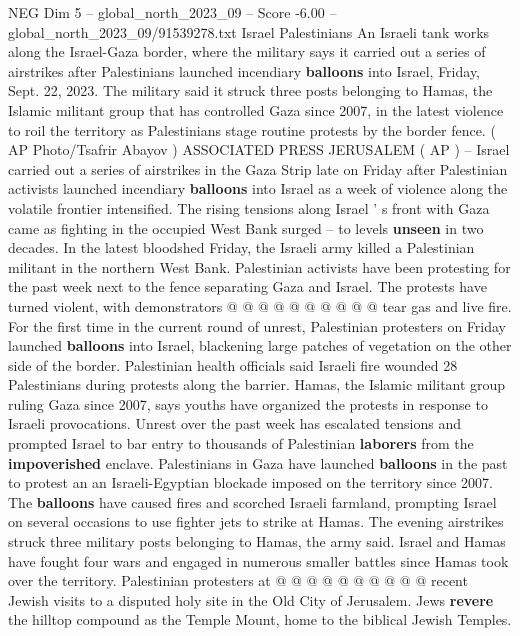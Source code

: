 \begin{textsample}{NEG Dim 5 – global\_north\_2023\_09 – Score -6.00 – global\_north\_2023\_09/91539278.txt}  \label{ex:f5_neg_001}
Israel Palestinians An Israeli tank works along the Israel-Gaza border, where the military says it carried out a series of airstrikes after Palestinians launched incendiary \textbf{balloons} into Israel, Friday, Sept. 22, 2023.
The military said it struck three posts belonging to Hamas, the Islamic militant group that has controlled Gaza since 2007, in the latest violence to roil the territory as Palestinians stage routine protests by the border fence. ( AP Photo/Tsafrir Abayov ) ASSOCIATED PRESS JERUSALEM ( AP ) -- Israel carried out a series of airstrikes in the Gaza Strip late on Friday after Palestinian activists launched incendiary \textbf{balloons} into Israel as a week of violence along the volatile frontier intensified.
The rising tensions along Israel ' s front with Gaza came as fighting in the occupied West Bank surged -- to levels \textbf{unseen} in two decades.
In the latest bloodshed Friday, the Israeli army killed a Palestinian militant in the northern West Bank.
Palestinian activists have been protesting for the past week next to the fence separating Gaza and Israel.
The protests have turned violent, with demonstrators @ @ @ @ @ @ @ @ @ @ tear gas and live fire.
For the first time in the current round of unrest, Palestinian protesters on Friday launched \textbf{balloons} into Israel, blackening large patches of vegetation on the other side of the border.
Palestinian health officials said Israeli fire wounded 28 Palestinians during protests along the barrier.
Hamas, the Islamic militant group ruling Gaza since 2007, says youths have organized the protests in response to Israeli provocations.
Unrest over the past week has escalated tensions and prompted Israel to bar entry to thousands of Palestinian \textbf{laborers} from the \textbf{impoverished} enclave.
Palestinians in Gaza have launched \textbf{balloons} in the past to protest an an Israeli-Egyptian blockade imposed on the territory since 2007.
The \textbf{balloons} have caused fires and scorched Israeli farmland, prompting Israel on several occasions to use fighter jets to strike at Hamas.
The evening airstrikes struck three military posts belonging to Hamas, the army said.
Israel and Hamas have fought four wars and engaged in numerous smaller battles since Hamas took over the territory.
Palestinian protesters at @ @ @ @ @ @ @ @ @ @ recent Jewish visits to a disputed holy site in the Old City of Jerusalem.
Jews \textbf{revere} the hilltop compound as the Temple Mount, home to the biblical Jewish Temples.

\end{textsample}
